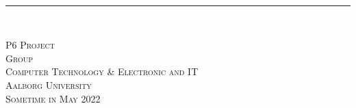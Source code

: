 \thispagestyle{empty}
\vspace{3cm}

\phantom{hul}

\phantom{hul}

\phantom{hul}

\textsl{\Huge } \\ \vspace{1cm}
\rule{15cm}{3mm} \\ \vspace{1cm}
\vspace{1cm}


\vspace{2cm} 
\textsc{\Large P6 Project \\
Group  \\
Computer Technology \& Electronic and IT\\
Aalborg University\\
Sometime in May 2022\\
}
